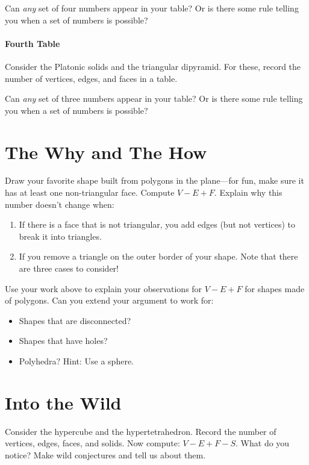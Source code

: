 \documentclass{ximera}
\begin{document}
\begin{question}
Can \textit{any} set of four numbers appear in your table? Or is
there some rule telling you when a set of numbers is possible? 
\end{question}


\paragraph{Fourth Table}

\begin{question}
Consider the Platonic solids and the triangular dipyramid. For these,
record the number of vertices, edges, and faces in a table.
\end{question}


\begin{question}
Can \textit{any} set of three numbers appear in your table? Or is
there some rule telling you when a set of numbers is possible? 
\end{question}



\section*{The Why and The How}


\begin{question}
Draw your favorite shape built from polygons in the plane---for fun,
make sure it has at least one non-triangular face. Compute
$V-E+F$. Explain why this number doesn't change when:
\begin{enumerate}
\item If there is a face that is not triangular, you add edges (but not vertices) to break it into triangles. 
\item If you remove a triangle on the outer border of your shape. Note that there are three cases to consider!
\end{enumerate}
\end{question}

\begin{question}
Use your work above to explain your observations for $V-E+F$ for
shapes made of polygons. Can you extend your argument to work for: 
\begin{itemize}
\item Shapes that are disconnected? 
\item Shapes that have holes?
\item Polyhedra? Hint: Use a sphere.
\end{itemize} 
\end{question}



\section*{Into the Wild}

\begin{question}
Consider the hypercube and the hypertetrahedron. Record the number of
vertices, edges, faces, and solids. Now compute: $V-E+F-S$. What do
you notice? Make wild conjectures and tell us about them.
\end{question}
\end{document}
